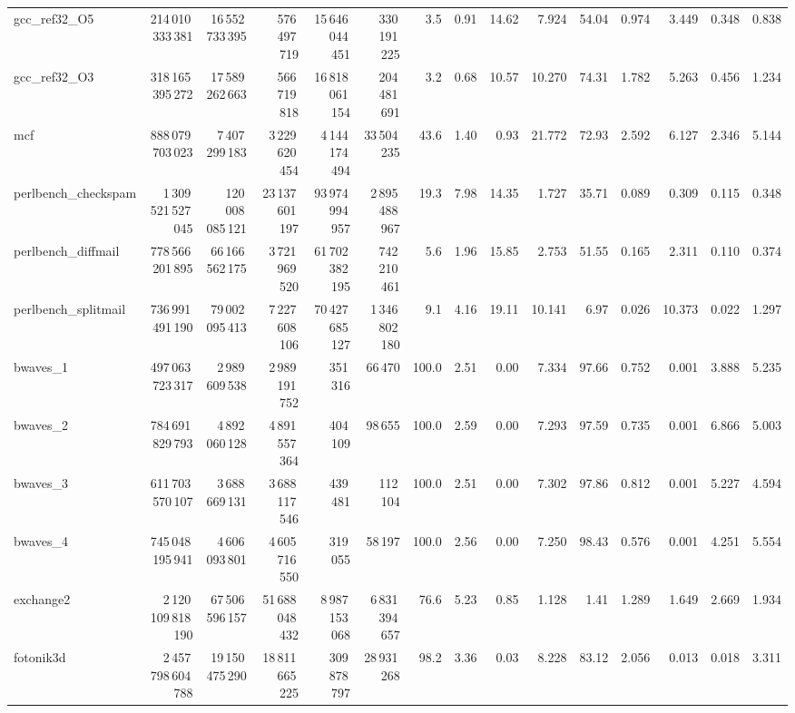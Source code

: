 \documentclass[9pt,landscape,a4paper]{article}
\begin{document}
\begin{adjustbox}{max width=\textwidth, max totalheight=0.50\textheight}
\begin{tabular}{lrrrrrrrrrrrrrr}
gcc\_ref32\_O5 & 214\,010\,333\,381 & 16\,552\,733\,395 & 576\,497\,719 & 15\,646\,044\,451 & 330\,191\,225 & 3.5 & 0.91 & 14.62 & 7.924 & 54.04 & 0.974 & 3.449 & 0.348 & 0.838 \\
gcc\_ref32\_O3 & 318\,165\,395\,272 & 17\,589\,262\,663 & 566\,719\,818 & 16\,818\,061\,154 & 204\,481\,691 & 3.2 & 0.68 & 10.57 & 10.270 & 74.31 & 1.782 & 5.263 & 0.456 & 1.234 \\
mcf & 888\,079\,703\,023 & 7\,407\,299\,183 & 3\,229\,620\,454 & 4\,144\,174\,494 & 33\,504\,235 & 43.6 & 1.40 & 0.93 & 21.772 & 72.93 & 2.592 & 6.127 & 2.346 & 5.144 \\
perlbench\_checkspam & 1\,309\,521\,527\,045 & 120\,008\,085\,121 & 23\,137\,601\,197 & 93\,974\,994\,957 & 2\,895\,488\,967 & 19.3 & 7.98 & 14.35 & 1.727 & 35.71 & 0.089 & 0.309 & 0.115 & 0.348 \\
perlbench\_diffmail & 778\,566\,201\,895 & 66\,166\,562\,175 & 3\,721\,969\,520 & 61\,702\,382\,195 & 742\,210\,461 & 5.6 & 1.96 & 15.85 & 2.753 & 51.55 & 0.165 & 2.311 & 0.110 & 0.374 \\
perlbench\_splitmail & 736\,991\,491\,190 & 79\,002\,095\,413 & 7\,227\,608\,106 & 70\,427\,685\,127 & 1\,346\,802\,180 & 9.1 & 4.16 & 19.11 & 10.141 & 6.97 & 0.026 & 10.373 & 0.022 & 1.297 \\
bwaves\_1 & 497\,063\,723\,317 & 2\,989\,609\,538 & 2\,989\,191\,752 & 351\,316 & 66\,470 & 100.0 & 2.51 & 0.00 & 7.334 & 97.66 & 0.752 & 0.001 & 3.888 & 5.235 \\
bwaves\_2 & 784\,691\,829\,793 & 4\,892\,060\,128 & 4\,891\,557\,364 & 404\,109 & 98\,655 & 100.0 & 2.59 & 0.00 & 7.293 & 97.59 & 0.735 & 0.001 & 6.866 & 5.003 \\
bwaves\_3 & 611\,703\,570\,107 & 3\,688\,669\,131 & 3\,688\,117\,546 & 439\,481 & 112\,104 & 100.0 & 2.51 & 0.00 & 7.302 & 97.86 & 0.812 & 0.001 & 5.227 & 4.594 \\
bwaves\_4 & 745\,048\,195\,941 & 4\,606\,093\,801 & 4\,605\,716\,550 & 319\,055 & 58\,197 & 100.0 & 2.56 & 0.00 & 7.250 & 98.43 & 0.576 & 0.001 & 4.251 & 5.554 \\
exchange2 & 2\,120\,109\,818\,190 & 67\,506\,596\,157 & 51\,688\,048\,432 & 8\,987\,153\,068 & 6\,831\,394\,657 & 76.6 & 5.23 & 0.85 & 1.128 & 1.41 & 1.289 & 1.649 & 2.669 & 1.934 \\
fotonik3d & 2\,457\,798\,604\,788 & 19\,150\,475\,290 & 18\,811\,665\,225 & 309\,878\,797 & 28\,931\,268 & 98.2 & 3.36 & 0.03 & 8.228 & 83.12 & 2.056 & 0.013 & 0.018 & 3.311 \\

\end{tabular}
\end{adjustbox}
\end{document}
